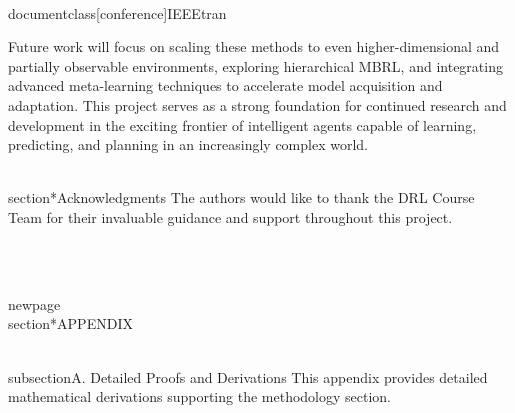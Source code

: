 \\documentclass[conference]{IEEEtran}
\begin{document}
Future work will focus on scaling these methods to even higher-dimensional and partially observable environments, exploring hierarchical MBRL, and integrating advanced meta-learning techniques to accelerate model acquisition and adaptation. This project serves as a strong foundation for continued research and development in the exciting frontier of intelligent agents capable of learning, predicting, and planning in an increasingly complex world.

\\section*{Acknowledgments}
The authors would like to thank the DRL Course Team for their invaluable guidance and support throughout this project.

\
\ %

\\newpage
\\section*{APPENDIX}

\\subsection{A. Detailed Proofs and Derivations}
This appendix provides detailed mathematical derivations supporting the methodology section.
\end{document}
